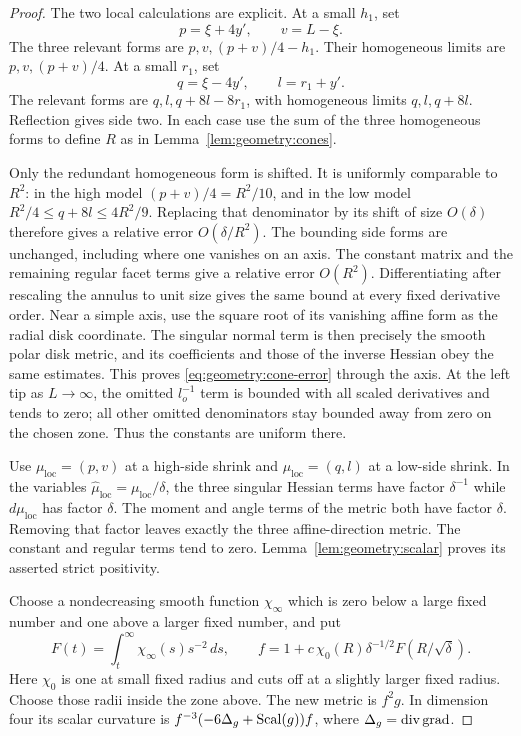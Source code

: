 \begin{proof}
The two local calculations are explicit.  At a small $h_1$, set
\[
 p=\xi+4y',\qquad v=L-\xi.
\]
The three relevant forms are $p,v,(p+v)/4-h_1$.  Their homogeneous
limits are $p,v,(p+v)/4$.  At a small $r_1$, set
\[
 q=\xi-4y',\qquad l=r_1+y'.
\]
The relevant forms are $q,l,q+8l-8r_1$, with homogeneous limits
$q,l,q+8l$.  Reflection gives side two.  In each case use the sum
of the three homogeneous forms to define $R$ as in
Lemma~\ref{lem:geometry:cones}.

Only the redundant homogeneous form is shifted.  It is uniformly
comparable to $R^2$: in the high model $(p+v)/4=R^2/10$, and in
the low model $R^2/4\le q+8l\le4R^2/9$.  Replacing that
denominator by its shift of size $O(\delta)$ therefore gives a
relative error $O(\delta/R^2)$.  The bounding side forms are
unchanged, including where one vanishes on an axis.  The constant
matrix and the remaining regular
facet terms give a relative error $O(R^2)$.  Differentiating after
rescaling the annulus to unit size gives the same bound at every
fixed derivative order.  Near a simple axis, use the square root
of its vanishing affine form as the radial disk coordinate.  The
singular normal term is then precisely the smooth polar disk
metric, and its coefficients and those of the inverse Hessian
obey the same estimates.  This proves
\eqref{eq:geometry:cone-error} through the axis.  At the left tip
as $L\to\infty$, the omitted $l_o^{-1}$ term is bounded with all
scaled derivatives and tends to zero; all other omitted
denominators stay bounded away from zero on the chosen zone.
Thus the constants are uniform there.

Use $\mu_{\mathrm{loc}}=(p,v)$ at a high-side shrink and
$\mu_{\mathrm{loc}}=(q,l)$ at a low-side shrink.  In the variables
$\widehat\mu_{\mathrm{loc}}=\mu_{\mathrm{loc}}/\delta$, the three
singular Hessian terms have factor $\delta^{-1}$ while
$d\mu_{\mathrm{loc}}$ has factor $\delta$.
The moment and angle terms of the metric both have
factor $\delta$.  Removing that factor leaves exactly the three
affine-direction metric.  The constant and regular terms tend
to zero.  Lemma~\ref{lem:geometry:scalar} proves its asserted
strict positivity.

Choose a nondecreasing smooth function $\chi_\infty$ which is zero
below a large fixed number and one above a larger fixed number,
and put
\begin{equation}
 F(t)=\int_t^\infty\chi_\infty(s)s^{-2}\,ds,
 \qquad
 f=1+c\,\chi_0(R)\delta^{-1/2}F(R/\sqrt\delta).
 \label{eq:geometry:conformal-factor}
\end{equation}
Here $\chi_0$ is one at small fixed radius and cuts off at a
slightly larger fixed radius.  Choose those radii inside the
zone above.  The new metric is $f^2g$.  In dimension four its
scalar curvature is $f^{-3}(-6\Delta_g+\operatorname{Scal}(g))f$, where
$\Delta_g=\operatorname{div}\operatorname{grad}$.


\end{proof}
